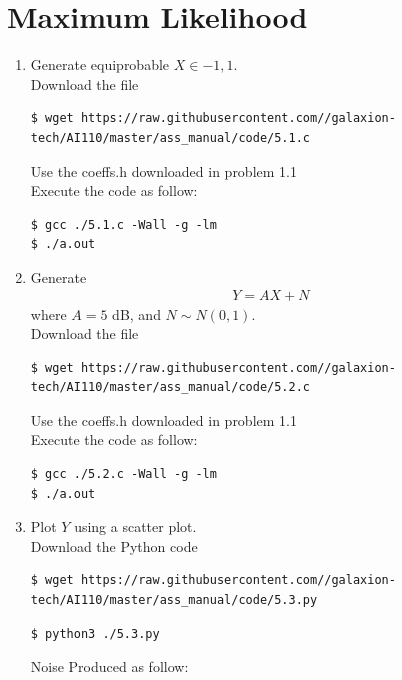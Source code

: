 \documentclass[journal,12pt,twocolumn]{IEEEtran}
\renewcommand\thesection{\arabic{section}}
\begin{document}
\section{Maximum Likelihood}
\begin{enumerate}[label=\thesection.\arabic*.,ref=\thesection.\theenumi]

\item Generate equiprobable $X \in {-1,1}$. \\
\solution Download the file\\
\begin{lstlisting}
$ wget https://raw.githubusercontent.com//galaxion-tech/AI110/master/ass_manual/code/5.1.c
\end{lstlisting}
Use the coeffs.h downloaded in problem 1.1\\
Execute the code as follow:
\begin{lstlisting}
$ gcc ./5.1.c -Wall -g -lm
$ ./a.out
\end{lstlisting}
\item Generate \begin{align}
    Y=AX+N
\end{align}
where $A=5$ dB, and $N \sim N(0,1)$.\\
\solution Download the file\\
\begin{lstlisting}
$ wget https://raw.githubusercontent.com//galaxion-tech/AI110/master/ass_manual/code/5.2.c
\end{lstlisting}
Use the coeffs.h downloaded in problem 1.1\\
Execute the code as follow:
\begin{lstlisting}
$ gcc ./5.2.c -Wall -g -lm
$ ./a.out
\end{lstlisting}
\item Plot $Y$ using a scatter plot.\\
\solution Download the Python code
\begin{lstlisting}
$ wget https://raw.githubusercontent.com//galaxion-tech/AI110/master/ass_manual/code/5.3.py
\end{lstlisting}
\begin{lstlisting}
$ python3 ./5.3.py
\end{lstlisting}
Noise Produced as follow:
\begin{figure}[H]

\end{figure}
\end{enumerate}
\end{document}
